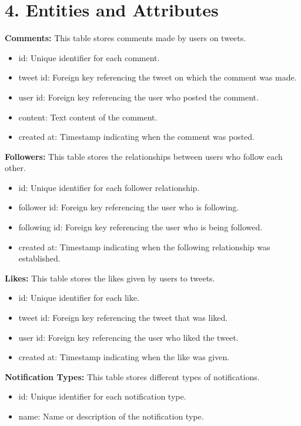 \documentclass{article}
\begin{document}
\section*{4. Entities and Attributes}
\textbf{Comments:} This table stores comments made by users on tweets.
\begin{itemize}[label=--]
    \item id: Unique identifier for each comment.
    \item tweet id: Foreign key referencing the tweet on which the comment was made.
    \item user id: Foreign key referencing the user who posted the comment.
    \item content: Text content of the comment.
    \item created at: Timestamp indicating when the comment was posted.
\end{itemize}
\textbf{Followers:} This table stores the relationships between users who follow each other.
\begin{itemize}[label=--]
    \item id: Unique identifier for each follower relationship.
    \item follower id: Foreign key referencing the user who is following.
    \item following id: Foreign key referencing the user who is being followed.
    \item created at: Timestamp indicating when the following relationship was established.
\end{itemize}
\textbf{Likes:} This table stores the likes given by users to tweets.
\begin{itemize}[label=--]
    \item id: Unique identifier for each like.
    \item tweet id: Foreign key referencing the tweet that was liked.
    \item user id: Foreign key referencing the user who liked the tweet.
    \item created at: Timestamp indicating when the like was given.
\end{itemize}
\textbf{Notification Types:} This table stores different types of notifications.
\begin{itemize}[label=--]
    \item id: Unique identifier for each notification type.
    \item name: Name or description of the notification type.
\end{itemize}
\end{document}
